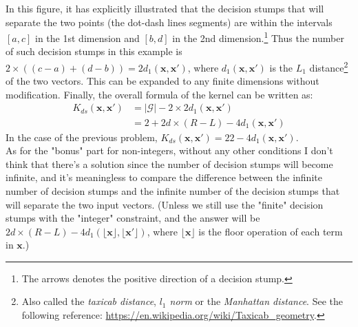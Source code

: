 \documentclass[11pt]{article}
\begin{document}
\begin{enumerate}[label=\textbf{\arabic*}.]

In this figure, it has explicitly illustrated that the decision stumps that will separate the two points (the dot-dash lines segments) are within the intervals $[a, c]$ in the 1st dimension and $[b, d]$ in the 2nd dimension.\footnote{The arrows denotes the positive direction of a decision stump.} Thus the number of such decision stumps in this example is $2\times((c-a)+(d-b))=2d_1(\mathbf{x}, \mathbf{x'})$, where $d_1(\mathbf{x}, \mathbf{x'})$ is the $L_1$ distance\footnote{Also called the \textit{taxicab distance}, \textit{$l_1$ norm} or the \textit{Manhattan distance}. See the following reference: \url{https://en.wikipedia.org/wiki/Taxicab_geometry}.} of the two vectors. This can be expanded to any finite dimensions without modification. Finally, the overall formula of the kernel can be written as:
\[\begin{aligned} K_{ds}(\mathbf{x}, \mathbf{x'}) &= |\mathcal{G}|-2\times 2d_1(\mathbf{x}, \mathbf{x'}) \\ &= 2 + 2d \times (R - L) - 4d_1(\mathbf{x}, \mathbf{x'}) \end{aligned} \]
In the case of the previous problem, $K_{ds}(\mathbf{x}, \mathbf{x'}) = 22 - 4d_1(\mathbf{x}, \mathbf{x'})$.\\
As for the "bonus" part for non-integers, without any other conditions I don't think that there's a solution since the number of decision stumps will become infinite, and it's meaningless to compare the difference between the infinite number of decision stumps and the infinite number of the decision stumps that will separate the two input vectors. (Unless we still use the "finite" decision stumps with the "integer" constraint, and the answer will be $2d \times (R - L) - 4d_1(\lfloor\mathbf{x}\rfloor, \lfloor\mathbf{x'}\rfloor)$, where $\lfloor\mathbf{x}\rfloor$ is the floor operation of each term in $\mathbf{x}$.)


\end{enumerate}
\end{document}
